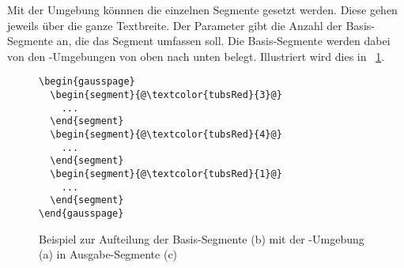 Mit der Umgebung  könnnen die einzelnen
Segmente gesetzt werden.
Diese gehen jeweils über die ganze Textbreite.
Der Parameter  gibt die Anzahl der Basis-Segmente an, die
das Segment umfassen soll.
Die Basis-Segmente werden dabei von den -Umgebungen
von oben nach unten belegt.
Illustriert wird dies in \figurename~\ref{fig:gausslayout:segment:beispiel}.

\begin{figure}[!ht]
\begin{minipage}[b]{0.3\textwidth}
\begin{lstlisting}[escapechar=@]
\begin{gausspage}
  \begin{segment}{@\textcolor{tubsRed}{3}@}
    ...
  \end{segment}
  \begin{segment}{@\textcolor{tubsRed}{4}@}
    ...
  \end{segment}
  \begin{segment}{@\textcolor{tubsRed}{1}@}
    ...
  \end{segment}
\end{gausspage}
\end{lstlisting}%
\label{fig:gausslayout:segment:beispiel:code}
\end{minipage}\hfill
\begin{minipage}[b]{0.32\textwidth}
  \label{fig:gausslayout:segment:beispiel:basis}
\end{minipage}\hfill
\begin{minipage}[b]{0.32\textwidth}
  \label{fig:gausslayout:segment:beispiel:aufteilung}
\end{minipage}
\caption{Beispiel zur Aufteilung der Basis-Segmente (b)
  mit der -Umgebung (a)
  in Ausgabe-Segmente (c)}
\label{fig:gausslayout:segment:beispiel}
\end{figure}



